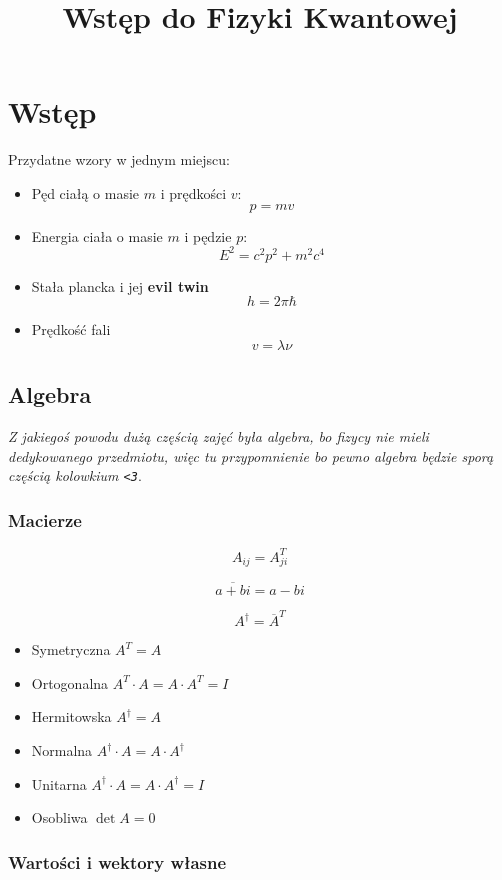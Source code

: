 \documentclass{../notatki}
\title{Wstęp do Fizyki Kwantowej}
\begin{document}
\section{Wstęp}

Przydatne wzory w jednym miejscu:
\begin{itemize}
  \item Pęd ciałą o masie $m$ i prędkości $v$:
    $$
    p = mv
    $$
  \item Energia ciała o masie $m$ i pędzie $p$: $$
    E^2 =c^2p^2 + m^2c^4
    $$
  \item Stała plancka i jej \textbf{evil twin} $$
    h = 2 \pi \hbar
    $$
  \item Prędkość fali $$
    v = \lambda \nu
    $$
\end{itemize}

\subsection{Algebra}

\textit{Z jakiegoś powodu dużą częścią zajęć była algebra, bo fizycy nie mieli
  dedykowanego przedmiotu, więc tu przypomnienie bo pewno algebra będzie sporą
częścią kolowkium \texttt{<3}}.

\subsubsection{Macierze}

$$
A_{ij} = A^T_{ji}
$$

$$
\overline{a + b\textit{i}} = a - b\textit{i}
$$

$$
A^\dag = \overline{A}^T
$$

\begin{itemize}
  \item Symetryczna $A^T = A$
  \item Ortogonalna $A^T \cdot A = A \cdot A^T = I$
  \item Hermitowska $A^\dag = A$
  \item Normalna $A^\dag \cdot A = A \cdot A^\dag$
  \item Unitarna $A^\dag \cdot A = A \cdot A^\dag = I$
  \item Osobliwa $\det A = 0$
\end{itemize}

\subsubsection{Wartości i wektory własne}
\end{document}
